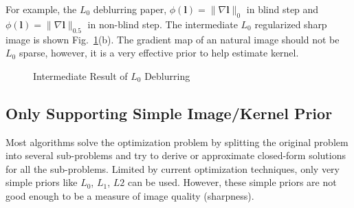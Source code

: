 \documentclass[journal, onecolumn, 10pt]{IEEEtran}
\begin{document}
For example, the $L_0$ deblurring paper, $\phi(\mathbf{l}) = \|\nabla \mathbf{l} \|_0$ in blind step and $\phi(\mathbf{l}) = \|\nabla \mathbf{l} \|_{0.5}$ in non-blind step. The intermediate $L_0$ regularized sharp image is shown Fig.~\ref{fig:L0_deblur_intermediate}(b). The gradient map of an natural image should not be $L_0$ sparse, however, it is a very effective prior to help estimate kernel.
\begin{figure}[h!]
\centering
{}
\hspace{\fill}
\hspace{\fill}
\hspace{\fill}
\caption{Intermediate Result of $L_0$ Deblurring}
\label{fig:L0_deblur_intermediate}
\end{figure}

\subsection{Only Supporting Simple Image/Kernel Prior}
Most algorithms solve the optimization problem by splitting the original problem into several sub-problems and try to derive or approximate closed-form solutions for all the sub-problems. Limited by current optimization techniques, only very simple priors like $L_0$, $L_1$, $L2$ can be used. However, these simple priors are not good enough to be a measure of image quality (sharpness).  
\end{document}
